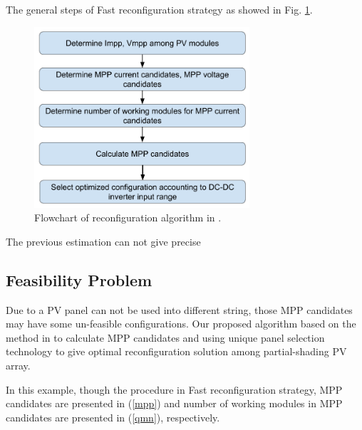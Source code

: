 \documentclass[conference]{IEEEtran}
\begin{document}
The general steps of Fast reconfiguration strategy as showed in Fig. \ref{flowchart}. 
\begin{figure}[htbp]
\centerline{\includegraphics[width=8cm]{flowchart.png}}
\caption{Flowchart of reconfiguration algorithm in \cite{b10}.}
\label{flowchart}
\end{figure}
The previous estimation can not give precise 
\subsection{Feasibility Problem}
Due to a PV panel can not be used into different string, those MPP candidates may have some un-feasible configurations. Our proposed algorithm based on the method in \cite{b10} to calculate MPP candidates and using unique panel selection technology to give optimal reconfiguration solution among partial-shading PV array. 

In this example, though the procedure in Fast reconfiguration strategy, MPP candidates are presented in (\ref{mpp}) and number of working modules in MPP candidates are presented in (\ref{qmn}), respectively. 
\end{document}
